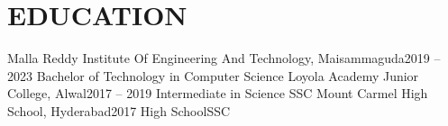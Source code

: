 \section{EDUCATION}
    \resumeSubHeadingListStart

    \resumeSubheading
    {Malla Reddy Institute Of Engineering And Technology, Maisammaguda}{2019 -- 2023}
    {Bachelor of Technology in Computer Science}{}
    \resumeSubheading
    {Loyola Academy Junior College, Alwal}{2017 -- 2019}
    {Intermediate in Science }{SSC}
    \resumeSubheading
    {Mount Carmel High School, Hyderabad}{2017}
{High School}{SSC}
    \resumeSubHeadingListEnd